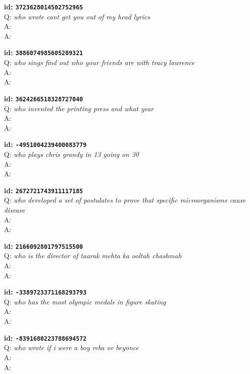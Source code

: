 \tiny{\setlength{\parindent}{0cm}
\textbf{id: \texttt{3723628014502752965}} \\
Q: \textit{who wrote cant get you out of my head lyrics} \\
A:  \\
A: }

\tiny{\setlength{\parindent}{0cm}
\textbf{id: \texttt{3886074985605209321}} \\
Q: \textit{who sings find out who your friends are with tracy lawrence} \\
A:  \\
A: }

\tiny{\setlength{\parindent}{0cm}
\textbf{id: \texttt{3624266518328727040}} \\
Q: \textit{who invented the printing press and what year} \\
A:  \\
A: }

\tiny{\setlength{\parindent}{0cm}
\textbf{id: \texttt{-4951004239400083779}} \\
Q: \textit{who plays chris grandy in 13 going on 30} \\
A:  \\
A: }

\tiny{\setlength{\parindent}{0cm}
\textbf{id: \texttt{2672721743911117185}} \\
Q: \textit{who developed a set of postulates to prove that specific microorganisms cause disease} \\
A:  \\
A: }

\tiny{\setlength{\parindent}{0cm}
\textbf{id: \texttt{2166092801797515500}} \\
Q: \textit{who is the director of taarak mehta ka ooltah chashmah} \\
A:  \\
A: }

\tiny{\setlength{\parindent}{0cm}
\textbf{id: \texttt{-3389723371168293793}} \\
Q: \textit{who has the most olympic medals in figure skating} \\
A:  \\
A: }

\tiny{\setlength{\parindent}{0cm}
\textbf{id: \texttt{-8391680223788694572}} \\
Q: \textit{who wrote if i were a boy reba or beyonce} \\
A:  \\
A: }

